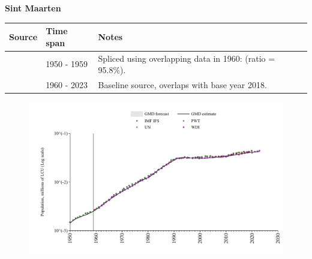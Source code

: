 \documentclass[12pt,a4paper,landscape]{article}
\begin{document}
\begin{adjustbox}{max totalsize={\paperwidth}{\paperheight},center}
\begin{minipage}[t][\textheight][t]{\textwidth}
\vspace*{0.5cm}
{}
\begin{center}
{\Large\bfseries Sint Maarten}
\end{center}
\vspace{0.5cm}
\begin{table}[H]
\centering
\small
\begin{tabular}{|l|l|l|}
\hline
\textbf{Source} & \textbf{Time span} & \textbf{Notes} \\
\hline
\rowcolor{white}\cite{IMF_IFS}& 1950 - 1959 &Spliced using overlapping data in 1960: (ratio = 95.8\%).\\
\rowcolor{lightgray}\cite{WDI}& 1960 - 2023 &Baseline source, overlaps with base year 2018.\\
\hline
\end{tabular}
\end{table}
\begin{figure}[H]
\centering
\includegraphics[width=\textwidth,height=0.6\textheight,keepaspectratio]{graphs/SXM_pop.pdf}
\end{figure}
\end{minipage}
\end{adjustbox}
\end{document}

